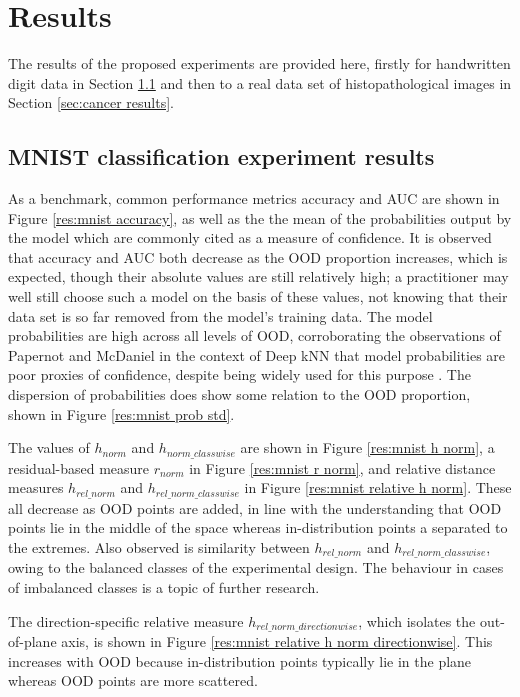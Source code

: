 \documentclass{article}
\begin{document}
\section{Results}
\label{sec:results section}
The results of the proposed experiments are provided here, firstly for handwritten digit data in Section \ref{sec:mnist results} and then to a real data set of histopathological images in Section \ref{sec:cancer results}.


\subsection{MNIST classification experiment results}
\label{sec:mnist results}
As a benchmark, common performance metrics accuracy and AUC are shown in Figure \ref{res:mnist accuracy}, as well as the the mean of the probabilities output by the model which are commonly cited as a measure of confidence. It is observed that accuracy and AUC both decrease as the OOD proportion increases, which is expected, though their absolute values are still relatively high; a practitioner may well still choose such a model on the basis of these values, not knowing that their data set is so far removed from the model's training data.
The model probabilities are high across all levels of OOD, corroborating the observations of Papernot and McDaniel in the context of Deep kNN that model probabilities are poor proxies of confidence, despite being widely used for this purpose \cite{papernot_deep_2018}. The dispersion of probabilities does show some relation to the OOD proportion, shown in Figure \ref{res:mnist prob std}.

The values of $h_{norm}$ and $h_{norm\_classwise}$ are shown in Figure \ref{res:mnist h norm}, a residual-based measure $r_{norm}$ in Figure \ref{res:mnist r norm}, and relative distance measures $h_{rel\_norm}$ and $h_{rel\_norm\_classwise}$ in Figure \ref{res:mnist relative h norm}.
These all decrease as OOD points are added, in line with the understanding that OOD points lie in the middle of the space whereas in-distribution points a separated to the extremes. Also observed is similarity between  $h_{rel\_norm}$ and $h_{rel\_norm\_classwise}$, owing to the balanced classes of the experimental design. The behaviour in cases of imbalanced classes is a topic of further research.

The direction-specific relative measure $h_{rel\_norm\_directionwise}$, which isolates the out-of-plane axis, is shown in Figure \ref{res:mnist relative h norm directionwise}.
This increases with OOD because in-distribution points typically lie in the plane whereas OOD points are more scattered.
\end{document}
